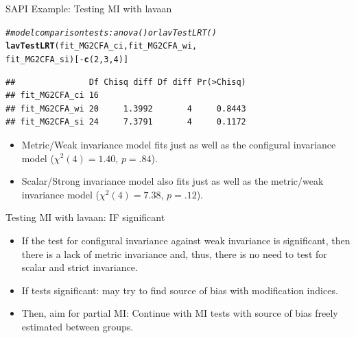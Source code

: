 \documentclass[10pt]{beamer}\usepackage[]{graphicx}\usepackage[]{xcolor}
\makeatletter
\newcommand{\hlnum}[1]{\textcolor[rgb]{0.686,0.059,0.569}{#1}}%
\newcommand{\hlcom}[1]{\textcolor[rgb]{0.678,0.584,0.686}{\textit{#1}}}%
\newcommand{\hlopt}[1]{\textcolor[rgb]{0,0,0}{#1}}%
\newcommand{\hlstd}[1]{\textcolor[rgb]{0.345,0.345,0.345}{#1}}%
\newcommand{\hlkwd}[1]{\textcolor[rgb]{0.737,0.353,0.396}{\textbf{#1}}}%
\newenvironment{kframe}{%
 \def\at@end@of@kframe{}%
 \ifinner\ifhmode%
  \def\at@end@of@kframe{\end{minipage}}%
  \begin{minipage}{\columnwidth}%
 \fi\fi%
 \def\FrameCommand##1{\hskip\@totalleftmargin \hskip-\fboxsep
 \colorbox{shadecolor}{##1}\hskip-\fboxsep
     \hskip-\linewidth \hskip-\@totalleftmargin \hskip\columnwidth}%
 \MakeFramed {\advance\hsize-\width
   \@totalleftmargin\z@ \linewidth\hsize
   \@setminipage}}%
 {\par\unskip\endMakeFramed%
 \at@end@of@kframe}
\newenvironment{knitrout}{}{} %
\makeatother
\begin{document}
\begin{frame}[fragile]{SAPI Example: Testing MI with lavaan}

\begin{knitrout}
\color{fgcolor}\begin{kframe}
\begin{alltt}
\hlcom{# model comparison tests: anova() or lavTestLRT()}
\hlkwd{lavTestLRT}\hlstd{(fit_MG2CFA_ci, fit_MG2CFA_wi,}
           \hlstd{fit_MG2CFA_si)[}\hlopt{-}\hlkwd{c}\hlstd{(}\hlnum{2}\hlstd{,}\hlnum{3}\hlstd{,}\hlnum{4}\hlstd{)]}
\end{alltt}
\begin{verbatim}
##               Df Chisq diff Df diff Pr(>Chisq)
## fit_MG2CFA_ci 16                              
## fit_MG2CFA_wi 20     1.3992       4     0.8443
## fit_MG2CFA_si 24     7.3791       4     0.1172
\end{verbatim}
\end{kframe}
\end{knitrout}

\begin{itemize}
    \item Metric/Weak invariance model fits just as well as the configural invariance model ($\chi^2(4) = 1.40$, $p = .84$).
    \item Scalar/Strong invariance model also fits just as well as the metric/weak invariance model ($\chi^2(4) = 7.38$, $p = .12$).
\end{itemize}

\end{frame}
%
\begin{frame}{Testing MI with lavaan: IF significant}

\begin{itemize}
\item If the test for configural invariance against weak invariance is significant, then there is a lack of metric invariance and, thus, there is no need to test for scalar and strict invariance.\\
	\vspace{5mm}
    \item If tests significant: may try to find source of bias with modification indices.
    \item Then, aim for partial MI: Continue with MI tests with source of bias freely estimated between groups.
\end{itemize}

\end{frame}
\end{document}

